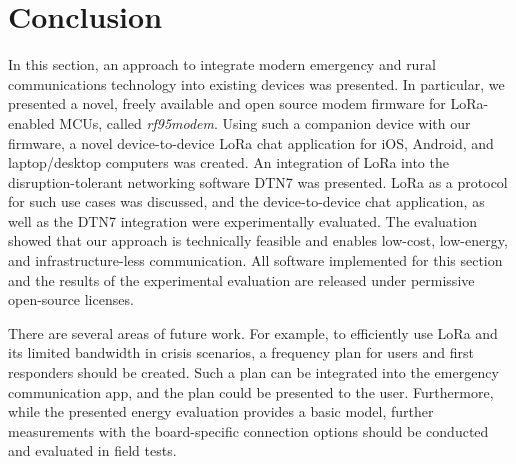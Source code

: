 \section{Conclusion}
\label{hoechst2020lora:sec:conclusion}

In this section, an approach to integrate modern emergency and rural communications technology into existing devices was presented. 
In particular, we presented a novel, freely available and open source modem firmware for LoRa-enabled MCUs, called \textit{rf95modem}.
Using such a companion device with our firmware, a novel device-to-device LoRa chat application for iOS, Android, and laptop/desktop computers was created. 
An integration of LoRa into the disruption-tolerant networking software DTN7 was presented.
LoRa as a protocol for such use cases was discussed, and the device-to-device chat application, as well as the DTN7 integration were experimentally evaluated.
The evaluation showed that our approach is technically feasible and enables  low-cost, low-energy, and infrastructure-less communication.
All software implemented for this section and the results of the experimental evaluation are released under permissive open-source licenses.

There are several areas of future work. For example, to efficiently use LoRa and its limited bandwidth in crisis scenarios, a frequency plan for users and first responders should be created.
Such a plan can be integrated into the emergency communication app, and the plan could be presented to the user.
Furthermore, while the presented energy evaluation provides a basic model, further measurements with the board-specific connection options should be conducted and evaluated in field tests.
